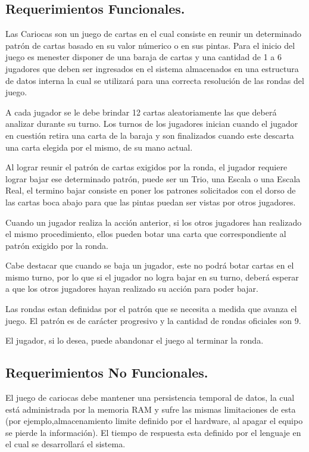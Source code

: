 \documentclass[60pt]{article}
\begin{document}
\subsection{Requerimientos Funcionales.}\label{cap:requerimientos-funcionales}
Las Cariocas son un juego de cartas en el cual consiste en reunir un determinado patrón de cartas basado en su valor númerico o en sus pintas. Para el inicio del juego es menester disponer de una baraja de cartas y una cantidad de 1 a 6 jugadores que deben ser ingresados en el sistema almacenados en una estructura de datos interna la cual se utilizará para una correcta resolución de las rondas del juego.

A cada jugador se le debe brindar 12 cartas aleatoriamente las que deberá analizar durante su turno. Los turnos de los jugadores inician cuando el jugador en cuestión retira una carta de la baraja y son finalizados cuando este descarta una carta elegida por el mismo, de su mano actual.

Al lograr reunir el patrón de cartas exigidos por la ronda, el jugador requiere lograr bajar ese determinado patrón, puede ser un Trio, una Escala o una Escala Real, el termino bajar consiste en poner los patrones solicitados con el dorso de las cartas boca abajo para que las pintas puedan ser vistas por otros jugadores.

Cuando un jugador realiza la acción anterior, si los otros jugadores han realizado el mismo procedimiento, ellos pueden botar una carta que correspondiente al patrón exigido por la ronda.

Cabe destacar que cuando se baja un jugador, este no podrá botar cartas en el mismo turno, por lo que si el jugador no logra bajar en su turno, deberá esperar a que los otros jugadores hayan realizado su acción para poder bajar.

Las rondas estan definidas por el patrón que se necesita a medida que avanza el juego. El patrón es de carácter progresivo y la cantidad de rondas oficiales son 9.

El jugador, si lo desea, puede abandonar el juego al terminar la ronda.
\subsection{Requerimientos No Funcionales.}\label{cap:requerimientos-no-funcionales}
El juego de cariocas debe mantener una persistencia temporal de datos, la cual está administrada por la memoria RAM y sufre las mismas limitaciones de esta (por ejemplo,almacenamiento limite definido por el hardware, al apagar el equipo se pierde la información).  El tiempo de respuesta esta definido por el lenguaje en el cual se desarrollará el sistema.
\end{document}
